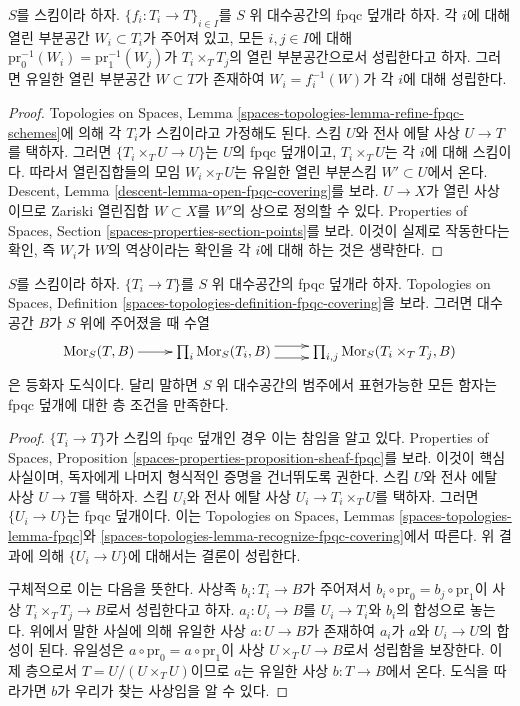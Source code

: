 \begin{lemma}
\label{lemma-open-fpqc-covering}
$S$를 스킴이라 하자. $\{f_i:T_i\to T\}_{i\in I}$를 $S$ 위
대수공간의 fpqc 덮개라 하자. 각 $i$에 대해 열린 부분공간
$W_i\subset T_i$가 주어져 있고, 모든 $i,j\in I$에 대해
$\text{pr}_0^{-1}(W_i)=\text{pr}_1^{-1}(W_j)$가
$T_i\times_TT_j$의 열린 부분공간으로서 성립한다고 하자. 그러면 유일한
열린 부분공간 $W\subset T$가 존재하여 $W_i=f_i^{-1}(W)$가 각 $i$에
대해 성립한다.
\end{lemma}

\begin{proof}
Topologies on Spaces, Lemma
\ref{spaces-topologies-lemma-refine-fpqc-schemes}에 의해 각 $T_i$가
스킴이라고 가정해도 된다. 스킴 $U$와 전사 에탈 사상 $U\to T$를
택하자. 그러면 $\{T_i\times_TU\to U\}$는 $U$의 fpqc 덮개이고,
$T_i\times_TU$는 각 $i$에 대해 스킴이다. 따라서 열린집합들의 모임
$W_i\times_TU$는 유일한 열린 부분스킴 $W'\subset U$에서 온다.
Descent, Lemma \ref{descent-lemma-open-fpqc-covering}를 보라.
$U\to X$가 열린 사상이므로 Zariski 열린집합 $W\subset X$를
$W'$의 상으로 정의할 수 있다. Properties of Spaces, Section
\ref{spaces-properties-section-points}를 보라. 이것이 실제로 작동한다는
확인, 즉 $W_i$가 $W$의 역상이라는 확인을 각 $i$에 대해 하는 것은
생략한다.
\end{proof}

\begin{lemma}
\label{lemma-fpqc-universal-effective-epimorphisms}
$S$를 스킴이라 하자. $\{T_i\to T\}$를 $S$ 위 대수공간의 fpqc
덮개라 하자. Topologies on Spaces, Definition
\ref{spaces-topologies-definition-fpqc-covering}을 보라. 그러면 대수공간
$B$가 $S$ 위에 주어졌을 때 수열
$$
\xymatrix{
\Mor_S(T, B) \ar[r] &
\prod\nolimits_i \Mor_S(T_i, B) \ar@<1ex>[r] \ar@<-1ex>[r] &
\prod\nolimits_{i, j} \Mor_S(T_i \times_T T_j, B)
}
$$
은 등화자 도식이다. 달리 말하면 $S$ 위 대수공간의 범주에서 표현가능한
모든 함자는 fpqc 덮개에 대한 층 조건을 만족한다.
\end{lemma}

\begin{proof}
$\{T_i\to T\}$가 스킴의 fpqc 덮개인 경우 이는 참임을 알고 있다.
Properties of Spaces, Proposition
\ref{spaces-properties-proposition-sheaf-fpqc}를 보라. 이것이 핵심 사실이며,
독자에게 나머지 형식적인 증명을 건너뛰도록 권한다. 스킴 $U$와 전사 에탈
사상 $U\to T$를 택하자. 스킴 $U_i$와 전사 에탈 사상
$U_i\to T_i\times_TU$를 택하자. 그러면 $\{U_i\to U\}$는 fpqc
덮개이다. 이는 Topologies on Spaces, Lemmas
\ref{spaces-topologies-lemma-fpqc}와
\ref{spaces-topologies-lemma-recognize-fpqc-covering}에서 따른다. 위 결과에
의해 $\{U_i\to U\}$에 대해서는 결론이 성립한다.

\medskip\noindent
구체적으로 이는 다음을 뜻한다. 사상족 $b_i:T_i\to B$가 주어져서
$b_i\circ\text{pr}_0=b_j\circ\text{pr}_1$이 사상
$T_i\times_TT_j\to B$로서 성립한다고 하자. $a_i:U_i\to B$를
$U_i\to T_i$와 $b_i$의 합성으로 놓는다. 위에서 말한 사실에 의해 유일한
사상 $a:U\to B$가 존재하여 $a_i$가 $a$와 $U_i\to U$의 합성이 된다.
유일성은 $a\circ\text{pr}_0=a\circ\text{pr}_1$이 사상
$U\times_TU\to B$로서 성립함을 보장한다. 이제 층으로서
$T=U/(U\times_TU)$이므로 $a$는 유일한 사상 $b:T\to B$에서 온다.
도식을 따라가면 $b$가 우리가 찾는 사상임을 알 수 있다.
\end{proof}

